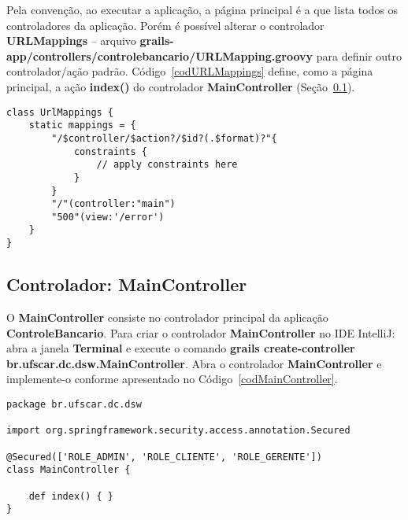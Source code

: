 Pela convenção, ao executar a aplicação,  a página principal é a que lista todos
os  controladores da  aplicação.  Porém  é possível  alterar o  controlador {\bf
  URLMappings}                  --                  arquivo                 {\bf
  grails-app/controllers/controlebancario/URLMapping.groovy}  para definir outro
controlador/ação  padrão.   Código~\ref{codURLMappings}  define, como  a  página
principal,   a  ação   {\bf   index()}  do   controlador  {\bf   MainController}
(Seção~\ref{secMainController}).

\begin{lstlisting}[caption={\bf   URLMappings.groovy},  frame=trBL,  float=htbp,
    label=codURLMappings] 
class UrlMappings {
	static mappings = {
        "/$controller/$action?/$id?(.$format)?"{
            constraints {
                // apply constraints here
            }
        }
        "/"(controller:"main")
        "500"(view:'/error')
	}
}
\end{lstlisting}

\newpage

\subsection{Controlador: MainController}\label{secMainController}


\vspace{0.5cm}

O  {\bf MainController}  consiste  no controlador  principal  da aplicação  {\bf
  ControleBancario}.   Para  criar o  controlador  {\bf  MainController} no  IDE
IntelliJ:  abra  a  janela  {\bf  Terminal}  e execute  o  comando  {\bf  grails
  create-controller  br.ufscar.dc.dsw.MainController}.  Abra o  controlador {\bf
  MainController}      e      implemente-o      conforme     apresentado      no
Código~\ref{codMainController}.  

\begin{lstlisting}[caption=Controlador    {\bf    MainController},   frame=trBL,
    float=htbp, label=codMainController] 
package br.ufscar.dc.dsw

import org.springframework.security.access.annotation.Secured

@Secured(['ROLE_ADMIN', 'ROLE_CLIENTE', 'ROLE_GERENTE'])
class MainController {

    def index() { }
}
\end{lstlisting}

